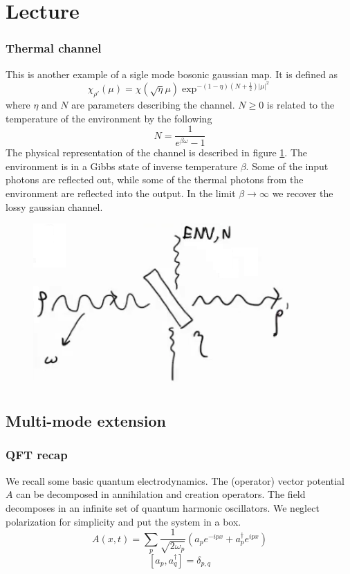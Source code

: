 \documentclass[a4paper, 11pt]{article}
\begin{document}
	\section{Lecture}
	\subsubsection{Thermal channel}
	This is another example of a sigle mode bosonic gaussian map. It is defined as
	\[ \chi_{\rho'}(\mu) = \chi(\sqrt{\eta}\mu) \exp^{-(1-\eta)(N+\frac{1}{2}) |\mu|^2} \]
	where $\eta$ and $N$ are parameters describing the channel. $N\ge 0$ is related to the temperature of the environment by the following
	\[ N = \dfrac{1}{e^{\beta\omega} -1} \]
	The physical representation of the channel is described in figure \ref{fig:thermal}. The environment is in a Gibbs state of inverse temperature $\beta$. Some of the input photons are reflected out, while some of the thermal photons from the environment are reflected into the output. In the limit $\beta\rightarrow \infty$ we recover the lossy gaussian channel.
	
	\begin{figure}
		\centering
		\includegraphics[width=0.7\linewidth]{thermal}
		\caption{}
		\label{fig:thermal}
	\end{figure}
	
	\subsection{Multi-mode extension}
	\subsubsection{QFT recap}
	We recall some basic quantum electrodynamics. The (operator) vector potential $A$ can be decomposed in annihilation and creation operators. The field decomposes in an infinite set of quantum harmonic oscillators. We neglect polarization for simplicity and put the system in a box.
	\[ A(x,t) = \sum_p \dfrac{1}{\sqrt{2\omega_p}} (a_p e^{-ipx} + a_p^\dagger e^{ipx}) \]
	\[ [a_p, a_q^\dagger] = \delta_{p,q} \]
	
\end{document}
